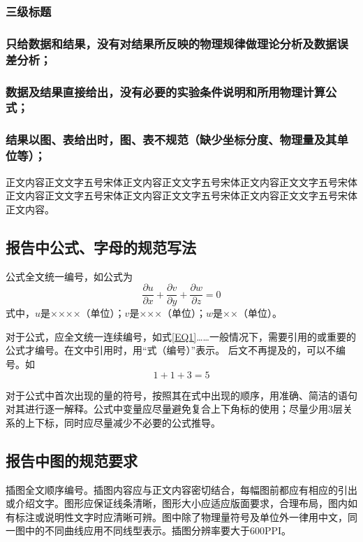 \documentclass{thuemp}
\begin{document}
\subsubsection{三级标题}
\subsubsection{只给数据和结果，没有对结果所反映的物理规律做理论分析及数据误差分析；}
\subsubsection{数据及结果直接给出，没有必要的实验条件说明和所用物理计算公式；}
\subsubsection{结果以图、表给出时，图、表不规范（缺少坐标分度、物理量及其单位等）；}
正文内容正文文字五号宋体正文内容正文文字五号宋体正文内容正文文字五号宋体正文内容正文文字五号宋体正文内容正文文字五号宋体正文内容正文文字五号宋体正文内容。
\subsection{报告中公式、字母的规范写法}
公式全文统一编号，如公式为
\begin{equation}\label{EQ1}
\frac{\partial u}{\partial x}+\frac{\partial v}{\partial y}+\frac{\partial w}{\partial z}=0
\end{equation}
式中，$u$是××××（单位）；$v$是×××（单位）；$w$是××（单位）。

对于公式，应全文统一连续编号，如式\eqref{EQ1}……一般情况下，需要引用的或重要的公式才编号。在文中引用时，用“式（编号）”表示。
后文不再提及的，可以不编号。如
\begin{equation*}
1 + 1 + 3 = 5
\end{equation*}

对于公式中首次出现的量的符号，按照其在式中出现的顺序，用准确、简洁的语句对其进行逐一解释。公式中变量应尽量避免复合上下角标的使用；尽量少用3层关系的上下标，同时应尽量减少不必要的公式推导。

\subsection{报告中图的规范要求}
插图全文顺序编号。插图内容应与正文内容密切结合，每幅图前都应有相应的引出或介绍文字。图形应保证线条清晰，图形大小应适应版面要求，合理布局，图内如有标注或说明性文字时应清晰可辨。图中除了物理量符号及单位外一律用中文，同一图中的不同曲线应用不同线型表示。插图分辨率要大于600PPI。
\end{document}
